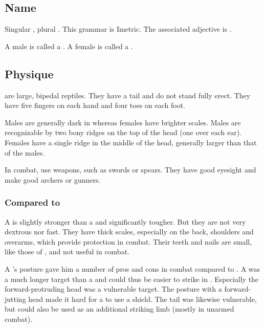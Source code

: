 \subsection{Name}
Singular \emph{\scatha{}}, plural \emph{\scathae{}}. 
This grammar is Imetric. 
The associated adjective is \emph{\scathaese{}}. 

A male \scatha{} is called a \dax. 
A female is called a \sphyle. 









\subsection{Physique}
\Scathae{} are large, bipedal reptiles. 
They have a tail and do not stand fully erect. 
They have five fingers on each hand and four toes on each foot. 

Males are generally dark in \colour whereas females have brighter scales. Males are recognizable by two bony ridges on the top of the head (one over each ear). Females have a single ridge in the middle of the head, generally larger than that of the males. 

In combat, \scathae{} use weapons, such as swords or spears. They have good eyesight and make good archers or gunners. 





\subsubsection{Compared to \humans}

A \scatha{} is slightly stronger than a \human and significantly tougher. 
But they are not very dextrous nor fast. 
They have thick scales, especially on the back, shoulders and overarms, which provide protection in combat. 
Their teeth and nails are small, like those of \humans, and not useful in combat. 

A \scatha's posture gave him a number of pros and cons in combat compared to \humans. 
A \scatha was a much longer target than a \human and could thus be easier to strike in \melee.
Especially the forward-protruding head was a vulnerable target. 
The posture with a forward-jutting head made it hard for a \scatha to use a shield. 
The tail was likewise vulnerable, but could also be used as an additional striking limb (mostly in unarmed combat).

